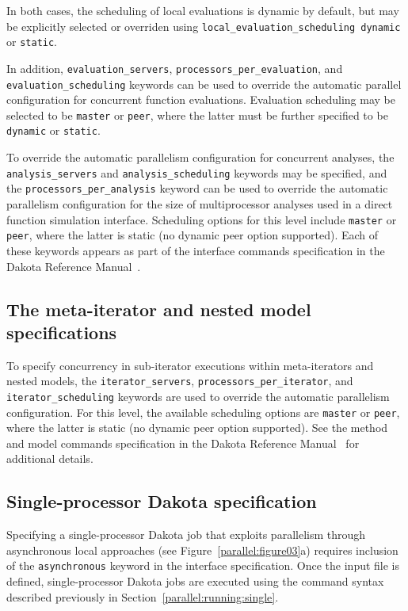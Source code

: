 In both cases, the scheduling of local evaluations is dynamic by
default, but may be explicitly selected or overriden using
\texttt{local\_evaluation\_scheduling dynamic} or \texttt{static}.

In addition, \texttt{evaluation\_servers},
\texttt{processors\_per\_evaluation}, and
\texttt{evaluation\_scheduling} keywords can be used to override the
automatic parallel configuration for concurrent function
evaluations. Evaluation scheduling may be selected to be
\texttt{master} or \texttt{peer}, where the latter must be further
specified to be \texttt{dynamic} or \texttt{static}. 

To override the automatic parallelism configuration for concurrent
analyses, the \texttt{analysis\_servers} and
\texttt{analysis\_scheduling} keywords may be specified, and the
\texttt{processors\_per\_analysis} keyword can be used to override the
automatic parallelism configuration for the size of multiprocessor
analyses used in a direct function simulation interface. Scheduling
options for this level include \texttt{master} or \texttt{peer}, where
the latter is static (no dynamic peer option supported).  Each of
these keywords appears as part of the interface commands specification
in the Dakota Reference Manual~\cite{RefMan}.

\subsection{The meta-iterator and nested model specifications}\label{parallel:spec:meta}

To specify concurrency in sub-iterator executions within
meta-iterators and nested models, the \texttt{iterator\_servers},
\texttt{processors\_per\_iterator}, and \texttt{iterator\_scheduling}
keywords are used to override the automatic parallelism configuration.
For this level, the available scheduling options are \texttt{master}
or \texttt{peer}, where the latter is static (no dynamic peer option
supported).  See the method and model commands specification in the
Dakota Reference Manual~\cite{RefMan} for additional details.

\subsection{Single-processor Dakota specification}\label{parallel:spec:single}

Specifying a single-processor Dakota job that exploits parallelism
through asynchronous local approaches (see
Figure~\ref{parallel:figure03}a) requires inclusion of the
\texttt{asynchronous} keyword in the interface specification. Once the
input file is defined, single-processor Dakota jobs are executed using
the command syntax described previously in
Section~\ref{parallel:running:single}.

